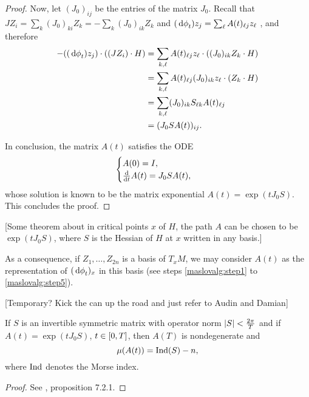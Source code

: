 \begin{proof}
Now, let $(J_0)_{ij}$ be the entries of the matrix $J_0$. Recall that $J Z_i = \sum_k (J_0)_{ki} Z_k = -\sum_k (J_0)_{ik} Z_k$ and $(\dl \phi_t) z_j = \sum_\ell A(t)_{\ell j} z_\ell$ , and therefore
\begin{equation}
\begin{aligned}
- ((\dl \phi_t) z_j) \cdot ((J Z_i) \cdot H) &= \sum_{k,\ell} A(t)_{\ell j} z_\ell \cdot ((J_0)_{ik} Z_k \cdot H)\\
&= \sum_{k,\ell} A(t)_{\ell j} (J_0)_{ik} z_\ell \cdot (Z_k \cdot H)\\
&= \sum_{k,\ell} (J_0)_{ik} S_{\ell k} A(t)_{\ell j}\\
&= (J_0 S A(t))_{ij}.
\end{aligned}
\end{equation}

In conclusion, the matrix $A(t)$ satisfies the ODE
\begin{equation}
\begin{cases}
A(0) = I,\\
\diff*{A(t)}t = J_0 S A(t),
\end{cases}
\end{equation}
whose solution is known to be the matrix exponential $A(t) = \exp(t J_0 S)$. This concludes the proof.
\end{proof}

[Some theorem about in critical points $x$ of $H$, the path $A$ can be chosen to be $\exp(t J_0 S)$, where $S$ is the Hessian of $H$ at $x$ written in any basis.]

As a consequence, if $Z_1, \dots, Z_{2n}$ is a basis of $T_x M$, we may consider $A(t)$ as the representation of $(\dl \phi_t)_x$ in this basis (see steps \ref{maslovalg:step1} to \ref{maslovalg:step5}).

[Temporary? Kick the can up the road and just refer to Audin and Damian]

\begin{theorem}
If $S$ is an invertible symmetric matrix with operator norm $\lvert S\rvert < \frac{2\pi}T$ and if $A(t) = \exp(t J_0 S)$, $t \in \interval 0 T$, then $A(T)$ is nondegenerate and
\begin{equation}
\mu(A(t)) = \operatorname{Ind}(S) - n,
\end{equation}
where $\operatorname{Ind}$ denotes the Morse index.
\end{theorem}

\begin{proof}
See \cite{audin}, proposition 7.2.1.
\end{proof}

